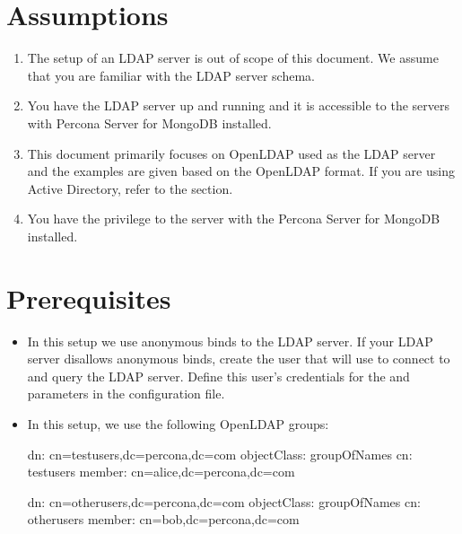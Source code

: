 \documentclass[letterpaper,10pt,english]{sphinxmanual}
\begin{document}
\section{Assumptions}
\label{\detokenize{ldap-setup:assumptions}}\begin{enumerate}
%
\item {} 
\sphinxAtStartPar
The setup of an LDAP server is out of scope of this document. We assume that you are familiar with the LDAP server schema.

\item {} 
\sphinxAtStartPar
You have the LDAP server up and running and it is accessible to the servers with Percona Server for MongoDB installed.

\item {} 
\sphinxAtStartPar
This document primarily focuses on OpenLDAP used as the LDAP server and the examples are given based on the OpenLDAP format. If you are using Active Directory, refer to the {\hyperref[\detokenize{ldap-setup:active-directory}]{}} section.

\item {} 
\sphinxAtStartPar
You have the  privilege to the server with the Percona Server for MongoDB installed.

\end{enumerate}


\section{Prerequisites}
\label{\detokenize{ldap-setup:prerequisites}}\begin{itemize}
\item {} 
\sphinxAtStartPar
In this setup we use anonymous binds to the LDAP server. If your LDAP server disallows anonymous binds, create the user that  will use to connect to and query the LDAP server. Define this user’s credentials for the  and   parameters in the  configuration file.

\item {} 
\sphinxAtStartPar
In this setup, we use the following OpenLDAP groups:

\begin{sphinxVerbatim}[commandchars=\\\{\}]
dn: cn=testusers,dc=percona,dc=com
objectClass: groupOfNames
cn: testusers
member: cn=alice,dc=percona,dc=com

dn: cn=otherusers,dc=percona,dc=com
objectClass: groupOfNames
cn: otherusers
member: cn=bob,dc=percona,dc=com
\end{sphinxVerbatim}

\end{itemize}
\end{document}
